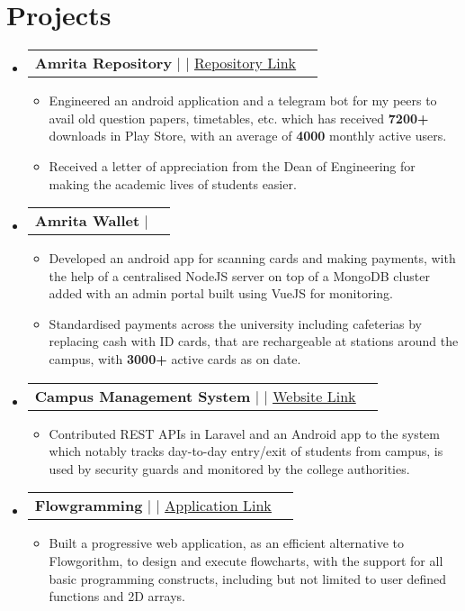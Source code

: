 \documentclass[letterpaper,11pt]{article}
\makeatletter
\newcommand{\resumeItem}[1]{
  \item\small{
    {#1 \vspace{-2pt}}
  }
}
\newcommand{\resumeProjectHeading}[2]{
    \item
    \begin{tabular*}{1.001\textwidth}{l@{\extracolsep{\fill}}r}
      \small#1 & \textbf{\small #2}\\
    \end{tabular*}\vspace{-7pt}
}
\newcommand{\resumeSubHeadingListStart}{\begin{itemize}[leftmargin=0.0in, label={}]}
\newcommand{\resumeSubHeadingListEnd}{\end{itemize}}
\newcommand{\resumeItemListStart}{\begin{itemize}}
\newcommand{\resumeItemListEnd}{\end{itemize}\vspace{-5pt}}
\makeatother
\begin{document}
\section{Projects}
    \vspace{-5pt}
    \resumeSubHeadingListStart
      \resumeProjectHeading
          {\textbf{Amrita Repository} $|$ \text{Android, SQLite, Web Scraping, PHP} $|$ \href{https://github.com/rajkumaar23/amrita-repository}{\underline {Repository Link}}}{}
          \resumeItemListStart
            \resumeItem{Engineered an android application and a telegram bot for my peers to avail old question papers, timetables,  etc.  which has received \textbf{7200+} downloads in Play Store,  with an average of \textbf{4000} monthly active users.}
            \resumeItem{Received a letter of appreciation from the Dean of Engineering for making the academic lives of students easier.}
          \resumeItemListEnd
          \vspace{-13pt}
      \resumeProjectHeading
          {\textbf{Amrita Wallet} $|$ \text{Android, NodeJS, MongoDB, jQuery, PM2}}{}
          \resumeItemListStart
            \resumeItem{Developed an android app for scanning cards and making payments,  with the help of a centralised NodeJS server on top of a MongoDB cluster added with an admin portal built using VueJS for monitoring.}          
            \resumeItem{Standardised payments across the university including cafeterias by replacing cash with ID cards,  that are rechargeable at stations around the campus,  with \textbf{3000+} active cards as on date.}
          \resumeItemListEnd 
          \vspace{-13pt}
          \resumeProjectHeading
          {\textbf{Campus Management System} $|$ \text{PHP, Laravel, MySQL, Android} $|$ \href{https://cms.cb.amrita.edu/humans.txt}{\underline{Website Link}}}{}
          \resumeItemListStart
            \resumeItem{Contributed REST APIs in Laravel and an Android app to the system which notably tracks day-to-day entry/exit of students from campus,  is used by security guards and monitored by the college authorities.}
          \resumeItemListEnd 
          \vspace{-13pt}
          \resumeProjectHeading
          {\textbf{Flowgramming} $|$ \text{HTML, Bootstrap, jQuery,  JointJS} $|$ \href{https://adoring-leakey-ec5a88.netlify.app/}{\underline{Application Link}}}{}
          \resumeItemListStart
            \resumeItem{Built a progressive web application,  as an efficient alternative to Flowgorithm,  to design and execute flowcharts,  with the support for all basic programming constructs,  including but not limited to user defined functions and 2D arrays.}
          \resumeItemListEnd 
    \resumeSubHeadingListEnd
\vspace{-15pt}
\end{document}
